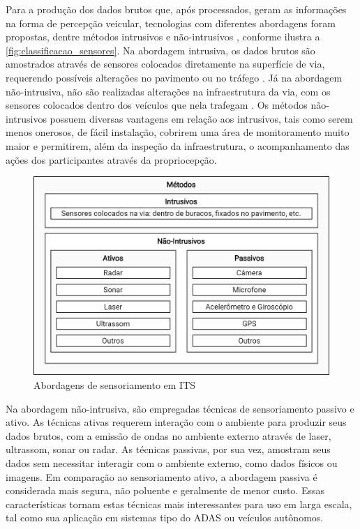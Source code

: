 Para a produção dos dados brutos que, após processados, geram as informações na forma de percepção veicular, tecnologias com diferentes abordagens foram propostas, dentre métodos intrusivos e não-intrusivos \cite{NI2016}, conforme ilustra a \autoref{fig:classificacao_sensores}. Na abordagem intrusiva, os dados brutos são amostrados através de sensores colocados diretamente na superfície de via, requerendo possíveis alterações no pavimento ou no tráfego \cite{mathew2014a}. Já na abordagem não-intrusiva, não são realizadas alterações na infraestrutura da via, com os sensores colocados dentro dos veículos que nela trafegam \cite{mathew2014b}. Os métodos não-intrusivos possuem diversas vantagens em relação aos intrusivos, tais como serem menos onerosos, de fácil instalação, cobrirem uma área de monitoramento muito maior e permitirem, além da inspeção da infraestrutura, o acompanhamento das ações dos participantes através da propriocepção.

\begin{figure}[h]
  \centering
  \caption{Abordagens de sensoriamento em ITS}
  \label{fig:classificacao_sensores}
  \includegraphics[width=0.9\linewidth]{figuras/fig_1.png}
\end{figure}

Na abordagem não-intrusiva, são empregadas técnicas de sensoriamento passivo e ativo. As técnicas ativas requerem interação com o ambiente para produzir seus dados brutos, com a emissão de ondas no ambiente externo através de laser, ultrassom, sonar ou radar. As técnicas passivas, por sua vez, amostram seus dados sem necessitar interagir com o ambiente externo, como dados físicos ou imagens. Em comparação ao sensoriamento ativo, a abordagem passiva é considerada mais segura, não poluente e geralmente de menor custo. Essas características tornam estas técnicas mais interessantes para uso em larga escala, tal como sua aplicação em sistemas tipo do ADAS ou veículos autônomos.


